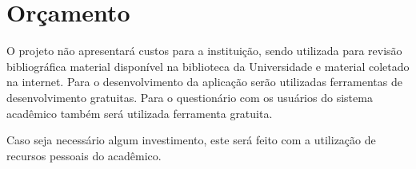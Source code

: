 \chapter{Orçamento}

O projeto não apresentará custos para a instituição, sendo utilizada para revisão bibliográfica material disponível na biblioteca da Universidade e material coletado na internet. Para o desenvolvimento da aplicação serão utilizadas ferramentas de desenvolvimento gratuitas. Para o questionário com os usuários do sistema acadêmico também será utilizada ferramenta gratuita.

Caso seja necessário algum investimento, este será feito com a utilização de recursos pessoais do acadêmico.